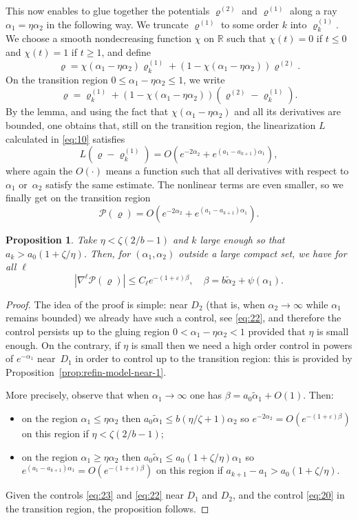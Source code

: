 \documentclass[10pt]{amsart}
\theoremstyle{plain}
\newtheorem{prop}[thm]{Proposition}
\theoremstyle{definition}
\newcommand{\ta}{\tilde \alpha}
\newcommand{\opP}{\mathcal{P}}
\newcommand{\rhodeux}{\varrho^{(2)}}
\newcommand{\rhoun}{\varrho^{(1)}}
\begin{document}
This now enables to glue together the potentials $\rhodeux$ and $\rhoun$ along a ray $\alpha_1=\eta \alpha_2$ in the following way. We truncate $\rhoun$ to some order $k$ into $\rhoun_k$. We choose a smooth nondecreasing function $\chi$ on $\mathbb{R}$ such that $\chi(t)=0$ if $t\leq0$ and $\chi(t)=1$ if $t\geq1$, and define
\begin{equation}
\varrho = \chi(\alpha_1-\eta \alpha_2) \rhoun_k + (1-\chi(\alpha_1-\eta \alpha_2)) \rhodeux.\label{eq:19}
\end{equation}
On the transition region $0\leq\alpha_1-\eta \alpha_2\leq1$, we write $$\varrho=\rhoun_k+(1-\chi(\alpha_1-\eta\alpha_2))(\rhodeux-\rhoun_k).$$ By the lemma, and using the fact that $\chi(\alpha_1-\eta\alpha_2)$ and all its derivatives are bounded, one obtains that, still on the transition region, the linearization $L$ calculated in \eqref{eq:10} satisfies
\[ L(\varrho-\rhoun_k) = O(e^{-2\alpha_2}+e^{(a_1-a_{k+1}) \alpha_1}), \]
where again the $O(\cdot)$ means a function such that all derivatives with respect to $\alpha_1$ or~$\alpha_2$ satisfy the same estimate. The nonlinear terms are even smaller, so we finally get on the transition region
\begin{equation}
\opP(\varrho) = O(e^{-2\alpha_2}+e^{(a_1-a_{k+1}) \alpha_1}).\label{eq:20}
\end{equation}

\begin{prop}\label{prop:est-P}
Take $\eta<\zeta(2/b-1)$ and $k$ large enough so that $a_k>a_0(1+\zeta/\eta)$. Then, for $(\alpha_1,\alpha_2)$ outside a large compact set, we have for all $\ell$
\[ |\nabla^\ell \opP(\varrho)| \leq C_\ell e^{-(1+\varepsilon)\beta}, \quad \beta=b\ta_2+\psi(\alpha_1). \]
\end{prop}
\begin{proof}
The idea of the proof is simple: near $D_2$ (that is, when $\alpha_2\to\infty$ while $\alpha_1$ remains bounded) we already have such a control, see \eqref{eq:22}, and therefore the control persists up to the gluing region $0<\alpha_1-\eta \alpha_2<1$ provided that $\eta$ is small enough. On the contrary, if $\eta$ is small then we need a high order control in powers of $e^{-\alpha_1}$ near~$D_1$ in order to control up to the transition region: this is provided by Proposition~\ref{prop:refin-model-near-1}.

More precisely, observe that when $\alpha_1\to\infty$ one has $\beta= a_0\ta_1+O(1)$. Then:
\begin{itemize}
\item on the region $\alpha_1\leq \eta\alpha_2$ then $a_0\ta_1\leq b(\eta/\zeta+1)\alpha_2$ so $e^{-2\alpha_2}=O(e^{-(1+\varepsilon)\beta})$ on this region if $\eta<\zeta(2/b-1)$;
\item on the region $\alpha_1\geq \eta\alpha_2$ then $a_0\ta_1\leq a_0(1+\zeta/\eta) \alpha_1$ so $e^{(a_1-a_{k+1})\alpha_1}=O(e^{-(1+\varepsilon)\beta})$ on this region if $a_{k+1}-a_1>a_0(1+\zeta/\eta)$.
\end{itemize}
Given the controls \eqref{eq:23} and \eqref{eq:22} near $D_1$ and $D_2$, and the control \eqref{eq:20} in the transition region, the proposition follows.
\end{proof}
\end{document}
